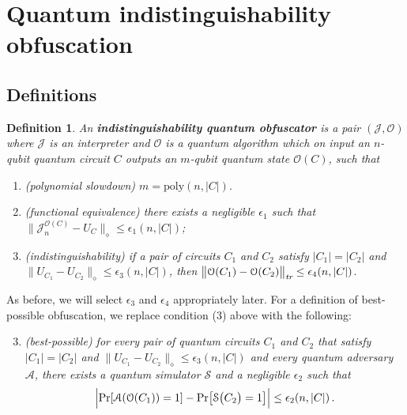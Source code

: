 \documentclass[11pt]{article}
\numberwithin{equation}{section}
\newtheorem{definition}{Definition}
\begin{document}
{%
%
%
%


\section{Quantum indistinguishability obfuscation}\label{sec:indistinguishability}

\subsection{Definitions}

\begin{definition}\label{def:indistinguishability}
An \textbf{indistinguishability quantum obfuscator} is a pair $(\mathcal J, \mathcal O)$ where $\mathcal J$ is an interpreter and $\mathcal O$ is a quantum algorithm which on input an $n$-qubit quantum circuit $C$ outputs an $m$-qubit quantum state $\mathcal O(C)$, such that
\begin{enumerate}
\item (polynomial slowdown) $m = \text{poly}(n, |C|).$
\item (functional equivalence) there exists a negligible $\epsilon_1$ such that $\bigl\| \mathcal J_n^{\mathcal O(C)} - U_C \bigr\|_\diamond \leq \epsilon_1(n, |C|)$;
\item (indistinguishability) if a pair of circuits $C_1$ and $C_2$ satisfy $|C_1| = |C_2|$ and $\bigl\|U_{C_1} - U_{C_2}\bigr\|_\diamond \leq \epsilon_3(n, |C|)$, then $\bigl\|\mathcal O(C_1) - \mathcal O(C_2)\bigr\|_\emph{tr} \leq \epsilon_4(n, |C|)$.
\end{enumerate}
\end{definition}
\noindent As before, we will select $\epsilon_3$ and $\epsilon_4$ appropriately later. For a definition of best-possible obfuscation, we replace condition (3) above with the following:

\begin{enumerate}
\setcounter{enumi}{2}
\item \emph{(best-possible) for every pair of quantum circuits $C_1$ and $C_2$ that satisfy $|C_1| = |C_2|$ and $\bigl\|U_{C_1} - U_{C_2}\bigr\|_\diamond \leq \epsilon_3(n, |C|)$ and every quantum adversary $\mathcal A$, there exists a quantum simulator $\mathcal S$ and a negligible $\epsilon_2$ such that}
$$
\Bigl| \text{Pr}[\mathcal A(\mathcal O(C_1)) = 1] - \text{Pr}\bigl[\mathcal S\bigl(C_2\bigr) = 1\bigr] \Bigr| \leq \epsilon_2(n, |C|)\,.
$$
\end{enumerate}

}
\end{document}
